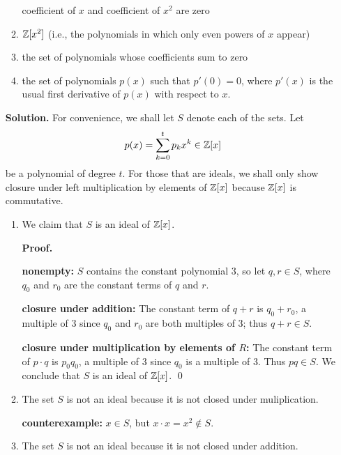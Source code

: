 \begin{enumerate}
\begin{enumerate}
                           coefficient of $x$ and coefficient of $x^2$ are zero
                     \item $\mathbb{Z}[x^2]$ (i.e., the polynomials in which only even
                           powers of $x$ appear)
                     \item the set of polynomials whose coefficients sum to
                           zero
                     \item the set of polynomials $p(x)$ such that $p'(0) = 0$,
                           where $p'(x)$ is the usual first derivative of $p(x)$
                           with respect to $x$.
                  \end{enumerate}

      \textbf{Solution.} For convenience, we shall let $S$ denote each of the
      sets. Let
      $$p(x) = \sum_{k=0}^tp_kx^k \in \mathbb{Z}[x]$$
      be a polynomial of degree $t$. For those that are ideals, we shall only
      show closure under left multiplication by elements of $\mathbb{Z}[x]$ because
      $\mathbb{Z}[x]$ is commutative.

      \begin{enumerate}
         \item We claim that $S$ is an ideal of $\mathbb{Z}[x]$.

               \textbf{Proof.} 

               \textbf{nonempty:} $S$ contains the constant polynomial 3, so let
               $q, r \in S$, where $q_0$ and $r_0$ are the constant terms of $q$
               and $r$. 

               \textbf{closure under addition:} The constant
               term of $q + r$ is $q_0 + r_0$, a multiple of 3 since $q_0$ and
               $r_0$ are both multiples of 3; thus $q + r \in S$.

               \textbf{closure under multiplication by elements of $R$:} The
               constant term of $p \cdot q$ is $p_0q_0$, a multiple of 3 since
               $q_0$ is a multiple of 3. Thus $pq \in S$. We conclude that $S$
               is an ideal of $\mathbb{Z}[x]$. \qed
         \item The set $S$ is not an ideal because it is not closed under
               muliplication.

               \textbf{counterexample:} $x \in S$, but
               $x \cdot x = x^2 \notin S$.
         \item The set $S$ is not an ideal because it is not closed under
               addition.


\end{enumerate}
\end{enumerate}

